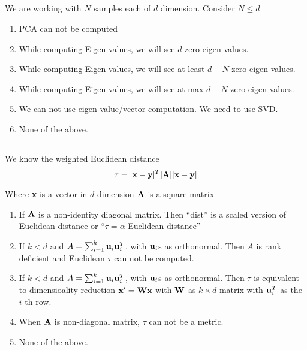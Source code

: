 \begin{frame}
\section{}
We are working with $N$ samples each of $d$ dimension.
Consider $N\le d$

\begin{enumerate}
\item PCA can not be computed
\item While computing Eigen values, we will see $d$ zero eigen values.
\item While computing Eigen values, we will see at least $d-N$ zero eigen values.   %
\item While computing Eigen values, we will see at max $d-N$ zero eigen values.
\item We can not use eigen value/vector computation. We need to use SVD.
\item None of the above.    %
\end{enumerate}
\end{frame}

\begin{frame}
\section{}
We know the weighted Euclidean distance
\[ \tau = [{\bf x} - {\bf y}]^T[{\bf A}][{\bf x} - {\bf y}] \]

Where {\bf x} is a vector in $d$ dimension ${\bf A}$ is a square matrix

\begin{enumerate}
\item If ${\bf A}$ is a non-identity diagonal matrix. Then ``dist'' is a scaled version of Euclidean distance or ``$\tau  = \alpha$  Euclidean distance''   %
\item If $k < d$ and $A = \sum_{i=1}^k {\bf u}_i{\bf u}_i^T$, with ${\bf u}_i$s as orthonormal. Then $A$ is rank deficient and Euclidean $\tau$ can not be computed.
\item If $k < d$ and $A = \sum_{i=1}^k {\bf u}_i{\bf u}_i^T$, with ${\bf u}_i$s as orthonormal. Then $\tau$ is equivalent to dimensioality reduction ${\bf x}^\prime = {\bf W}{\bf x}$ with ${\bf W}$ as $k\times d$ matrix with ${\bf u}_i^T$ as the $i$ th row.   %
\item When ${\bf A}$ is non-diagonal matrix, $\tau$ can not be a metric.
\item None of the above.    %
\end{enumerate}
\end{frame}

